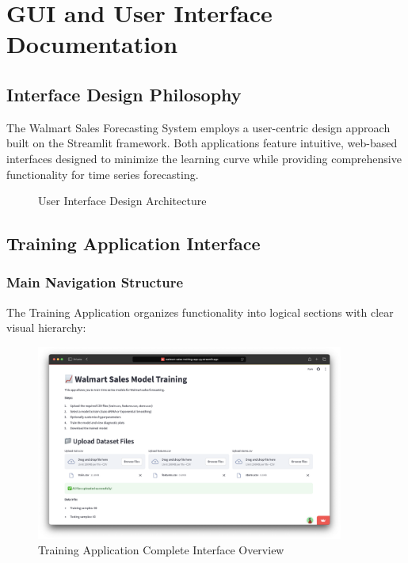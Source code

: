 %
%
%



\chapter{GUI and User Interface Documentation}

\section{Interface Design Philosophy}

The Walmart Sales Forecasting System employs a user-centric design approach built on the Streamlit framework. Both applications feature intuitive, web-based interfaces designed to minimize the learning curve while providing comprehensive functionality for time series forecasting.

\begin{figure}[H]
    \centering
    
    \caption{User Interface Design Architecture}
    \label{fig:interface_design}
\end{figure}

\section{Training Application Interface}

\subsection{Main Navigation Structure}

The Training Application organizes functionality into logical sections with clear visual hierarchy:

\begin{figure}[H]
    \centering
    \includegraphics[width=0.9\textwidth]{Images/04GUIAndUserInterface/TrainingAppOverview.png}
    \caption{Training Application Complete Interface Overview}
    \label{fig:training_app_overview}
\end{figure}

